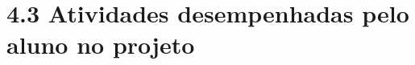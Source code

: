\hypertarget{__RefHeading___Toc4813_3118176633}{}
\section*{4.3 Atividades desempenhadas pelo aluno no projeto}
\label{ages-iii:text-h-0086}
